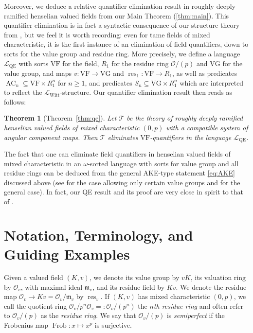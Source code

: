 \documentclass[a4paper]{amsart}
\theoremstyle{mystyle2}
\newtheorem*{thm*}{Theorem}
\theoremstyle{mystyle}
\DeclareMathOperator{\res}{res}
\DeclareMathOperator{\Frob}{Frob}
\newcommand{\cT}{\mathcal{T}}
\renewcommand{\L}{\mathcal{L}}
\newcommand{\LWitt}{\L_{\mathrm{Witt}}}
\renewcommand{\O}{\mathcal{O}}
\newcommand{\m}{\mathfrak{m}}
\newcommand{\LQE}{\L_\mathrm{QE}}
\newcommand{\VF}{\mathrm{VF}}
\newcommand{\VG}{\mathrm{VG}}
\numberwithin{equation}{section}
\begin{document}
    Moreover, we deduce a relative quantifier elimination result in roughly deeply ramified 
    henselian valued fields from our Main Theorem (\cref{thm:main}).
    This quantifier elimination is in fact a syntactic consequence of our structure 
    theory from , but we feel it is worth recording: even for tame fields of mixed characteristic, it is the first instance of an elimination of field quantifiers, 
    down to sorts for the value group and residue ring. More precisely,
    we define a language $\mathcal{L}_\mathrm{QE}$ with sorts $\VF$ for the field,
    $R_1$ for the residue ring $\O/(p)$ and $\VG$ for the value group, and
    maps $v\colon \VF\to \VG$ and $\res_1\colon \VF\to R_1$,
    as well as predicates $\operatorname{AC}_n\subseteq \VF\times R_1^n$ for $n\geq 1$, and
     predicates $S_n\subseteq \VG\times R_1^n$ which are interpreted to reflect the
     $\LWitt$-structure.
    Our quantifier elimination result then reads as follows:
    \begin{thm*}[{{{Theorem~\ref{thm:qe}}}}]
        Let $\cT$ be the theory of roughly deeply ramified henselian valued fields of
        mixed characteristic $(0,p)$
        with a compatible system of angular component maps.
        Then $\cT$ eliminates \(\VF\)-quantifiers in the language $\LQE$.
    \end{thm*}
    The fact that one can eliminate field quantifiers in 
    henselian valued fields of mixed
    characteristic in an $\omega$-sorted language with sorts for value group
    and all residue rings can be deduced from the general AKE-type statement 
    \eqref{eq:AKE} discussed above (see \cite[Theorem 4.2]{Weis} for the case allowing only certain value groups and \cite[Theorem 3.3.10]{rideau2022model} for the general case). In fact, 
    our QE result and its proof are very close
    in spirit to that of \cite[Theorem 3.3.10]{rideau2022model}.

\section{Notation, Terminology, and Guiding Examples} \label{sec:not}
Given a valued field \( (K,v) \), we denote its value group by \(vK\), its valuation ring by \(\O_v\), with maximal ideal \(\mathfrak{m}_v\), and its residue field by \(Kv\). We denote the residue map \(\O_v\to Kv=\O_v/\m_v\) by \(\res_v\).
If $(K,v)$ has mixed characteristic $(0,p)$, we call the quotient ring 
$\O_v/p^n\O_v=:\O_v/(p^n)$ the \emph{$n$th residue ring} and often refer to $\O_v/(p)$ as the \emph{residue ring}. 
We say that $\O_v/(p)$ is \emph{semiperfect} if the Frobenius map $\Frob\colon x \mapsto x^p$ is surjective.
\end{document}

